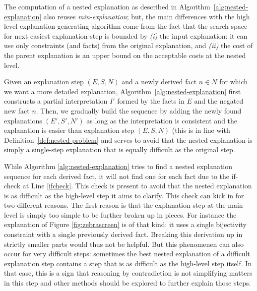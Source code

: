 The computation of a nested explanation as described in Algorithm~\ref{alg:nested-explanation} also reuses \textit{min-explanation}; but, the main differences with the high level explanation generating algorithm come from the fact that the search space for next easiest explanation-step is bounded by \emph{(i)} the input explanation: it can use only constraints (and facts) from the original explanation, and \emph{(ii)} the cost of the parent explanation is an upper bound on the acceptable costs at the nested level. 

Given an explanation step $(E, S, N)$ and a newly derived fact $n \in N$ for which we want a more detailed explanation, Algorithm~\ref{alg:nested-explanation} first constructs a partial interpretation $I'$ formed by the facts in $E$ and the negated new fact $n$. 
Then, we gradually build the sequence by adding the newly found explanations $(E', S', N')$ as long as the interpretation is consistent and the explanation is easier than explanation step $(E, S, N)$ (this is in line with Definition~\ref{def:nested-problem} and serves to avoid that the nested explanation is simply a single-step explanation that is equally difficult as the original step.  

While Algorithm \ref{alg:nested-explanation} tries to find a nested explanation sequence for each derived fact, it will not find one for each fact due to the if-check at Line \ref{ifcheck}. This check is present to avoid that the nested explanation is as difficult as the high-level step it aims to clarify. This check can kick in for two different reasons. The first reason is that the explanation step at the main level is simply too simple to be further broken up in pieces. For instance the explanation of Figure \ref{fig:zebrascreen} is of that kind: it uses a single bijectivity constraint with a single previously derived fact. Breaking this derivation up in strictly smaller parts would thus not be helpful. But this phenomenen can also occur for very difficult steps: sometimes the best nested explanation of a difficult explanation step contains a step that is as difficult as the high-level step itself. In that case, this is a sign that reasoning by contradiction is not simplifying matters in this step and other methods should be explored to further explain those steps. 

